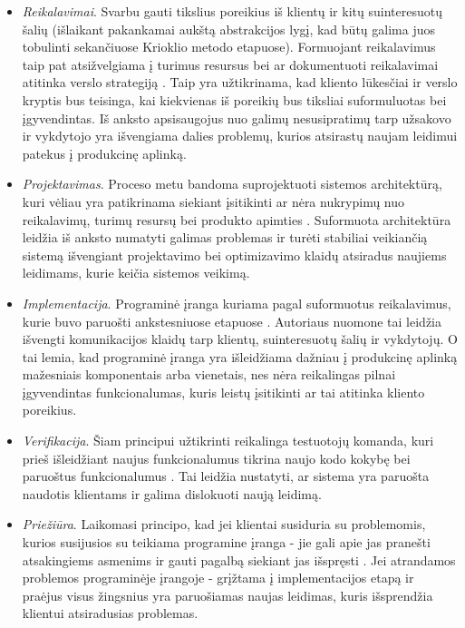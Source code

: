 \documentclass{VUMIFPSkursinis}
\begin{document}
\begin{itemize}
  \item \textit{Reikalavimai}. Svarbu gauti tikslius poreikius iš klientų ir kitų suinteresuotų šalių (išlaikant pakankamai aukštą abstrakcijos lygį, kad būtų galima juos tobulinti sekančiuose Krioklio metodo etapuose). Formuojant reikalavimus taip pat atsižvelgiama į turimus resursus bei ar dokumentuoti reikalavimai atitinka verslo strategiją \cite{SaltKetvirtas}. Taip yra užtikrinama, kad kliento lūkesčiai ir verslo kryptis bus teisinga, kai kiekvienas iš poreikių bus tiksliai suformuluotas bei įgyvendintas. Iš anksto apsisaugojus nuo galimų nesusipratimų tarp užsakovo ir vykdytojo yra išvengiama dalies problemų, kurios atsirastų naujam leidimui patekus į produkcinę aplinką.

  \item \textit{Projektavimas}. Proceso metu bandoma suprojektuoti sistemos architektūrą, kuri vėliau yra patikrinama siekiant įsitikinti ar nėra nukrypimų nuo reikalavimų, turimų resursų bei produkto apimties \cite{SaltKetvirtas}. Suformuota architektūra leidžia iš anksto numatyti galimas problemas ir turėti stabiliai veikiančią sistemą išvengiant projektavimo bei optimizavimo klaidų atsiradus naujiems leidimams, kurie keičia sistemos veikimą. 
  
  \item \textit{Implementacija}. Programinė įranga kuriama pagal suformuotus reikalavimus, kurie buvo paruošti ankstesniuose etapuose \cite{SaltPenktas}.  Autoriaus nuomone tai leidžia išvengti komunikacijos klaidų tarp klientų, suinteresuotų šalių ir vykdytojų. O tai lemia, kad programinė įranga yra išleidžiama dažniau į produkcinę aplinką mažesniais komponentais arba vienetais, nes nėra reikalingas pilnai įgyvendintas funkcionalumas, kuris leistų įsitikinti ar tai atitinka kliento poreikius.
  
  \item \textit{Verifikacija}. Šiam principui užtikrinti reikalinga testuotojų komanda, kuri prieš išleidžiant naujus funkcionalumus tikrina naujo kodo kokybę bei paruoštus funkcionalumus \cite{SaltKetvirtas}. Tai leidžia nustatyti, ar sistema yra paruošta naudotis klientams ir galima dislokuoti naują leidimą.
  
  \item \textit{Priežiūra}. Laikomasi principo, kad jei klientai susiduria su problemomis, kurios susijusios su teikiama programine įranga - jie gali apie jas pranešti atsakingiems asmenims ir gauti pagalbą siekiant jas išspręsti \cite{SaltKetvirtas}. Jei atrandamos problemos programinėje įrangoje - grįžtama į implementacijos etapą ir praėjus visus žingsnius yra paruošiamas naujas leidimas, kuris išsprendžia klientui atsiradusias problemas.
\end{itemize}
\end{document}
